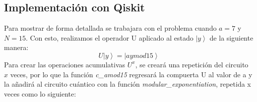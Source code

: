 \subsection{Implementación con Qiskit}
Para mostrar de forma detallada se trabajara con el problema cuando $a=7$ y $N=15$. Con esto, realizamos el operador U aplicado al estado $\left|y \right\rangle$ de la siguiente manera:
\begin{equation}
    U\left| y \right\rangle = \left|aymod15 \right\rangle 
    \label{eq:ua15}
\end{equation}
Para crear las operaciones acumulativas $U^x$, se creará una repetición del circuito $x$ veces, por lo que la función \textcolor{def}{\textit{c\_amod15}}
 regresará la compuerta U al valor de a y la añadirá al circuito cuántico con la función \textcolor{def}{\textit{modular\_exponentiation}}, repetida x veces como lo siguiente:
